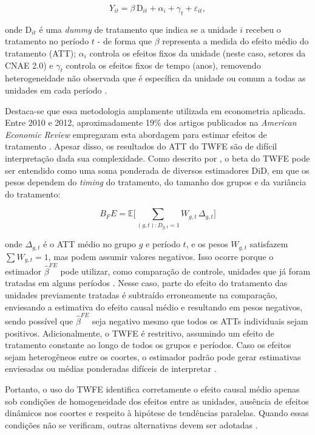 \documentclass[12pt,a4paper,oneside]{article}
\begin{document}
\begin{equation}
	Y_{it} = \beta \, \text{D}_{it} + \alpha_i + \gamma_t + \varepsilon_{it},
\end{equation}

onde $\text{D}_{it}$ é uma \textit{dummy} de tratamento que indica se a unidade $i$ recebeu o tratamento no período $t$ - de forma que $\beta$ representa a medida do efeito médio do tratamento (ATT); $\alpha_i$ controla os efeitos fixos da unidade (neste caso, setores da CNAE 2.0) e $\gamma_t$ controla os efeitos fixos de tempo (anos), removendo heterogeneidade não observada que é específica da unidade ou comum a todas as unidades em cada período \citep{mundlak1978}. 

Destaca-se que essa metodologia amplamente utilizada em econometria aplicada. Entre 2010 e 2012, aproximadamente 19\% dos artigos publicados na \textit{American Economic Review} empregaram esta abordagem para estimar efeitos de tratamento \citep{DeChaisemartin2020}. Apesar disso, os resultados do ATT do TWFE são de difícil interpretação dada sua complexidade. Como descrito por \citet{GoodmanBacon2021}, o beta do TWFE pode ser entendido como uma soma ponderada de diversos estimadores DiD, em que os pesos dependem do \textit{timing} do tratamento, do tamanho dos grupos e da variância do tratamento:

\[
B_FE = \mathbb{E} \Bigg[ \sum_{(g,t) : D_{g,t} = 1} W_{g,t} \, \Delta_{g,t} \Bigg]
\]

onde $\Delta_{g,t}$ é o ATT médio no grupo $g$ e período $t$, e os pesos $W_{g,t}$ satisfazem $\sum W_{g,t} = 1$, mas podem assumir valores negativos. Isso ocorre porque o estimador $\hat{\beta}^{FE}$ pode utilizar, como comparação de controle, unidades que já foram tratadas em alguns períodos \citep{DeChaisemartin2020}. Nesse caso, parte do efeito do tratamento das unidades previamente tratadas é subtraído erroneamente na comparação, enviesando a estimativa do efeito causal médio e resultando em pesos negativos, sendo possível que $\hat{\beta}^{FE}$ seja negativo mesmo que todos os ATTs individuais sejam positivos. Adicionalmente, o TWFE é restritivo, assumindo um efeito de tratamento constante ao longo de todos os grupos e períodos. Caso os efeitos sejam heterogêneos entre os coortes, o estimador padrão pode gerar estimativas enviesadas ou médias ponderadas difíceis de interpretar \citep{Wooldridge2025}. 

Portanto, o uso do TWFE identifica corretamente o efeito causal médio apenas sob condições de homogeneidade dos efeitos entre as unidades, ausência de efeitos dinâmicos nos coortes e respeito à hipótese de tendências paralelas. Quando essas condições não se verificam, outras alternativas devem ser adotadas \citep{Wooldridge2023}.
\end{document}
